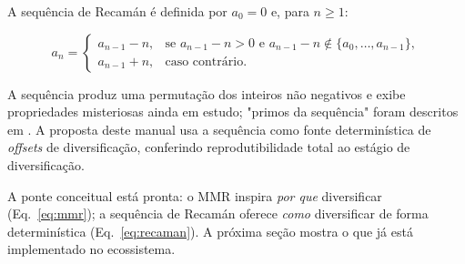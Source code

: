  A sequência de Recamán é definida por $a_0 = 0$ e, para $n \geq 1$:

\begin{equation}
\label{eq:recaman}
a_n = \begin{cases}
a_{n-1} - n, & \text{se } a_{n-1} - n > 0 \text{ e } a_{n-1} - n \notin \{a_0,\dots,a_{n-1}\},\\
a_{n-1} + n, & \text{caso contrário}.
\end{cases}
\end{equation}

A sequência produz uma permutação dos inteiros não negativos e exibe propriedades
misteriosas ainda em estudo; "primos da sequência" foram descritos em
\cite{Alekseyev2022RecamanCousins}. A proposta deste manual usa a sequência como
fonte determinística de \emph{offsets} de diversificação, conferindo
reprodutibilidade total ao estágio de diversificação.

\begin{pontochave}
A ponte conceitual está pronta: o MMR inspira \emph{por que} diversificar
(Eq.~\ref{eq:mmr}); a sequência de Recamán oferece \emph{como} diversificar de
forma determinística (Eq.~\ref{eq:recaman}). A próxima seção mostra o que já está
implementado no ecossistema.
\end{pontochave}
